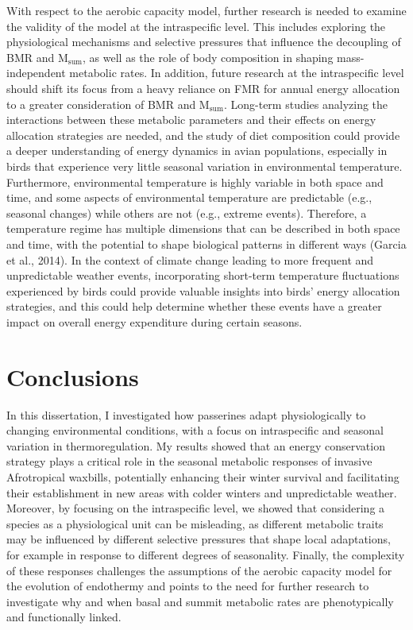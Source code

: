 \documentclass[10pt, twoside]{book} %
\begin{document}
With respect to the aerobic capacity model, further research is needed to examine the validity of the model at the intraspecific level. This includes exploring the physiological mechanisms and selective pressures that influence the decoupling of BMR and M$_{\text{sum}}$, as well as the role of body composition in shaping mass-independent metabolic rates. In addition, future research at the intraspecific level should shift its focus from a heavy reliance on FMR for annual energy allocation to a greater consideration of BMR and M$_{\text{sum}}$. Long-term studies analyzing the interactions between these metabolic parameters and their effects on energy allocation strategies are needed, and the study of diet composition could provide a deeper understanding of energy dynamics in avian populations, especially in birds that experience very little seasonal variation in environmental temperature. Furthermore, environmental temperature is highly variable in both space and time, and some aspects of environmental temperature are predictable (e.g., seasonal changes) while others are not (e.g., extreme events). Therefore, a temperature regime has multiple dimensions that can be described in both space and time, with the potential to shape biological patterns in different ways (Garcia et al., 2014). In the context of climate change leading to more frequent and unpredictable weather events, incorporating short-term temperature fluctuations experienced by birds could provide valuable insights into birds' energy allocation strategies, and this could help determine whether these events have a greater impact on overall energy expenditure during certain seasons. \\

\section{Conclusions}

In this dissertation, I investigated how passerines adapt physiologically to changing environmental conditions, with a focus on intraspecific and seasonal variation in thermoregulation. My results showed that an energy conservation strategy plays a critical role in the seasonal metabolic responses of invasive Afrotropical waxbills, potentially enhancing their winter survival and facilitating their establishment in new areas with colder winters and unpredictable weather. Moreover, by focusing on the intraspecific level, we showed that considering a species as a physiological unit can be misleading, as different metabolic traits may be influenced by different selective pressures that shape local adaptations, for example in response to different degrees of seasonality. Finally, the complexity of these responses challenges the assumptions of the aerobic capacity model for the evolution of endothermy and points to the need for further research to investigate why and when basal and summit metabolic rates are phenotypically and functionally linked.\\
\end{document}
